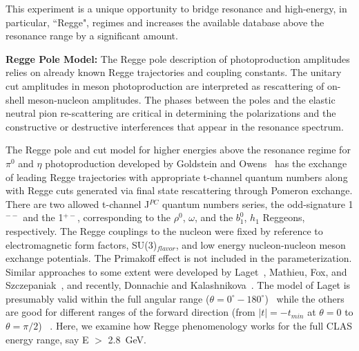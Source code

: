 \documentclass[aps,prc,twocolumn,floatfix,showpacs,preprintnumbers,amsmath,amssymb,superscriptaddress]{revtex4-1}
\begin{document}
This experiment is a unique opportunity to bridge resonance and 
high-energy, in particular, ``Regge", regimes and increases the
available database above the resonance range by a significant amount.




\textbf{Regge Pole Model:} The Regge pole description of photoproduction amplitudes relies on 
already known Regge 
trajectories and coupling constants. The unitary cut amplitudes in meson
photoproduction are interpreted as rescattering of on-shell meson-nucleon amplitudes.  
The phases between the poles and the elastic neutral 
pion re-scattering 
are critical in determining the polarizations and the constructive or destructive interferences that appear in the resonance spectrum.

The Regge pole and cut model for higher energies above the
resonance regime for $\pi^0$ and $\eta$ photoproduction developed  by Goldstein 
and Owens~\cite{Goldstein} has the exchange of leading Regge 
trajectories with appropriate t-channel quantum numbers along 
with Regge cuts generated via 
final state rescattering 
through Pomeron exchange. There are two allowed t-channel J$^{PC}$ 
quantum numbers series, the odd-signature 1$^{--}$ and the 1$^{+-}$, 
corresponding to the $\rho^0$, $\omega$, and the $b^0_1$, $h_1$ 
Reggeons, respectively. The Regge couplings to the nucleon were fixed by 
reference to electromagnetic form factors, SU(3)$_{flavor}$, and low 
energy nucleon-nucleon meson exchange potentials.  The Primakoff 
effect is not included in the parameterization.  Similar approaches 
to some extent were developed by Laget~\cite{Laget}, Mathieu, 
Fox, and Szczepaniak~\cite{Mathieu}, and recently, Donnachie and 
Kalashnikova~\cite{Donnachie}.  
The model of Laget is presumably 
valid within the full angular range ($\theta = 
0^\circ - 180^\circ$)~\cite{Laget} while the others are 
good for different ranges of the forward direction (from $|t| = 
-t_{min}$ at $\theta=0$ to $\theta=\pi/2$)
~\cite{Goldstein,Mathieu,Donnachie}. Here, we examine
how Regge phenomenology works for the full CLAS energy range, say
E $>$ 2.8~GeV.
\end{document}
